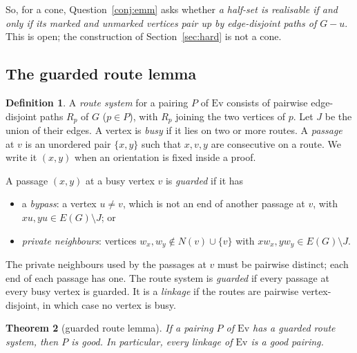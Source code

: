 \documentclass[11pt]{amsart}
\newtheorem{theorem}{Theorem}
\theoremstyle{definition}
\newtheorem{definition}[theorem]{Definition}
\newcommand{\Ev}{\mathrm{Ev}}
\begin{document}
So, for a cone, Question~\ref{conj:emm} asks whether \emph{a half-set is realisable if and only if
its marked and unmarked vertices pair up by edge-disjoint paths of $G-u$}. This is open; the
construction of Section~\ref{sec:hard} is not a cone.

\subsection{The guarded route lemma}

\begin{definition}
A \emph{route system} for a pairing $P$ of $\Ev$ consists of pairwise edge-disjoint paths $R_p$ of $G$
($p\in P$), with $R_p$ joining the two vertices of $p$. Let $J$ be the union of their edges. A vertex
is \emph{busy} if it lies on two or more routes. A \emph{passage} at $v$ is an unordered pair
$\{x,y\}$ such that $x,v,y$ are consecutive on a route. We write it $(x,y)$ when an orientation is
fixed inside a proof.

A passage $(x,y)$ at a busy vertex $v$ is \emph{guarded} if it has
\begin{itemize}
\item[(a)] a \emph{bypass}: a vertex $u\neq v$, which is not an end of another passage at $v$, with
$xu,yu\in E(G)\setminus J$; or
\item[(b)] \emph{private neighbours}: vertices $w_x,w_y\notin N(v)\cup\{v\}$ with
$xw_x,yw_y\in E(G)\setminus J$.
\end{itemize}
The private neighbours used by the passages at $v$ must be pairwise distinct; each end of each passage
has one. The route system is
\emph{guarded} if every passage at every busy vertex is guarded. It is a \emph{linkage} if the routes
are pairwise vertex-disjoint, in which case no vertex is busy.
\end{definition}

\begin{theorem}[guarded route lemma]\label{thm:guarded}
If a pairing $P$ of $\Ev$ has a guarded route system, then $P$ is good. In particular, every linkage
of $\Ev$ is a good pairing.
\end{theorem}
\end{document}
